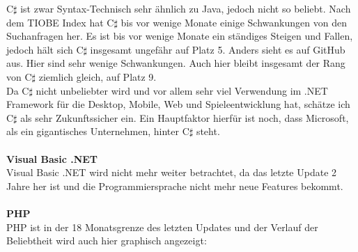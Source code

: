 \documentclass[ngerman]{article}
\begin{document}
    C$\sharp$ ist zwar Syntax-Technisch sehr ähnlich zu Java, jedoch nicht so beliebt. Nach dem TIOBE Index hat C$\sharp$ bis vor wenige Monate einige Schwankungen von den Suchanfragen her. Es ist bis vor wenige Monate ein ständiges Steigen und Fallen, jedoch hält sich C$\sharp$ insgesamt ungefähr auf Platz 5. Anders sieht es auf GitHub aus. Hier sind sehr wenige Schwankungen. Auch hier bleibt insgesamt der Rang von C$\sharp$ ziemlich gleich, auf Platz 9.\\
    Da C$\sharp$ nicht unbeliebter wird und vor allem sehr viel Verwendung im .NET Framework für die Desktop, Mobile, Web und Spieleentwicklung hat, schätze ich C$\sharp$ als sehr Zukunftssicher ein. Ein Hauptfaktor hierfür ist noch, dass Microsoft, als ein gigantisches Unternehmen, hinter C$\sharp$ steht.\\\\
    \textbf{Visual Basic .NET}\\
    Visual Basic .NET wird nicht mehr weiter betrachtet, da das letzte Update 2 Jahre her ist und die Programmiersprache nicht mehr neue Features bekommt.\\\\
    \textbf{PHP}\\
    PHP ist in der 18 Monatsgrenze des letzten Updates und der Verlauf der Beliebtheit wird auch hier graphisch angezeigt:
\end{document}
